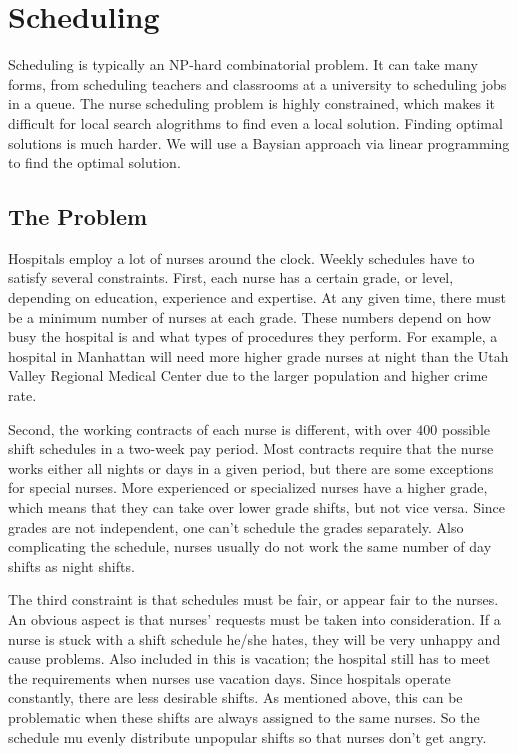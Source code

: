 \label{lab:Scheduling}

\section*{Scheduling}

Scheduling is typically an NP-hard combinatorial problem.
It can take many forms, from scheduling teachers and classrooms at a university to scheduling jobs in a queue.
The nurse scheduling problem is highly constrained, which makes it difficult for local search alogrithms to find even a local solution.
Finding optimal solutions is much harder.
We will use a Baysian approach via linear programming to find the optimal solution.


\subsection*{The Problem}
Hospitals employ a lot of nurses around the clock.
Weekly schedules have to satisfy several constraints.
First, each nurse has a certain grade, or level, depending on education, experience and expertise.
At any given time, there must be a minimum number of nurses at each grade.
These numbers depend on how busy the hospital is and what types of procedures they perform.
For example, a hospital in Manhattan will need more higher grade nurses at night than the Utah Valley Regional Medical Center due to the larger population and higher crime rate. 

Second, the working contracts of each nurse is different, with over $400$ possible shift schedules in a two-week pay period.
Most contracts require that the nurse works either all nights or days in a given period, but there are some exceptions for special nurses.
More experienced or specialized nurses have a higher grade, which means that they can take over lower grade shifts, but not vice versa.
Since grades are not independent, one can't schedule the grades separately.
Also complicating the schedule, nurses usually do not work the same number of day shifts as night shifts.  

The third constraint is that schedules must be fair, or appear fair to the nurses.
An obvious aspect is that nurses' requests must be taken into consideration.
If a nurse is stuck with a shift schedule he/she hates, they will be very unhappy and cause problems.
Also included in this is vacation; the hospital still has to meet the requirements when nurses use vacation days.
Since hospitals operate constantly, there are less desirable shifts.
As mentioned above, this can be problematic when these shifts are always assigned to the same nurses.
So the schedule mu evenly distribute unpopular shifts so that nurses don't get angry. 

